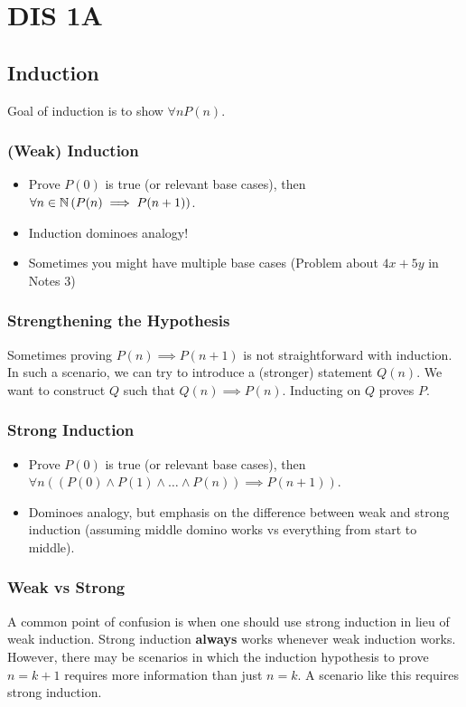 \section{DIS 1A}

\subsection{Induction}
Goal of induction is to show $\forall n P(n)$. 
\subsubsection{(Weak) Induction}
\begin{itemize}
    \item Prove $P(0)$ is true (or relevant base cases), then $\forall n \in \operatorname{\mathbb{N}} \left(P(n) \implies P(n+1)\right)$. 
    \item Induction dominoes analogy! 
    \item Sometimes you might have multiple base cases (Problem about $4x+5y$ in Notes 3)
\end{itemize}

\subsubsection{Strengthening the Hypothesis}

Sometimes proving $P(n) \implies P(n+1)$ is not straightforward with induction. In such a scenario, we can try to introduce a (stronger) statement $Q(n)$. We want to construct $Q$ such that $Q(n) \implies P(n)$. Inducting on $Q$ proves $P$. 

\subsubsection{Strong Induction}
\begin{itemize}
    \item Prove $P(0)$ is true (or relevant base cases), then $\forall n \left(\left(P(0) \land P(1) \land \dots \land P(n)\right) \implies P(n+1)\right)$. 
    \item Dominoes analogy, but emphasis on the difference between weak and strong induction (assuming middle domino works vs everything from start to middle).   
\end{itemize}

\subsubsection{Weak vs Strong}

A common point of confusion is when one should use strong induction in lieu of weak induction. Strong induction \textbf{always} works whenever weak induction works. However, there may be scenarios in which the induction hypothesis to prove $n=k+1$ requires more information than just $n=k$. A scenario like this requires strong induction.